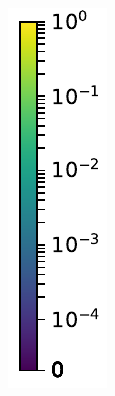 \documentclass[10pt,letterpaper]{article}
\begin{document}
\begin{figure}[h!]
\begin{subfigure}[t]{0.079\textwidth}
						\includegraphics[width=\textwidth]{fig/cbar}
					\end{subfigure}
					\caption{}
				\end{figure}
		
\end{document}
